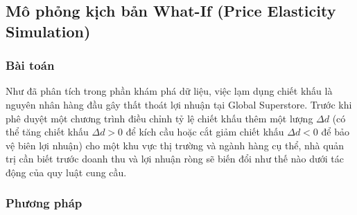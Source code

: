 \subsection{Mô phỏng kịch bản What-If (Price Elasticity Simulation)}

\subsubsection{Bài toán}

Như đã phân tích trong phần khám phá dữ liệu, việc lạm dụng chiết khấu là nguyên nhân hàng đầu gây thất thoát lợi nhuận tại Global Superstore. Trước khi phê duyệt một chương trình điều chỉnh tỷ lệ chiết khấu thêm một lượng $\Delta d$ (có thể tăng chiết khấu $\Delta d > 0$ để kích cầu hoặc cắt giảm chiết khấu $\Delta d < 0$ để bảo vệ biên lợi nhuận) cho một khu vực thị trường và ngành hàng cụ thể, nhà quản trị cần biết trước doanh thu và lợi nhuận ròng sẽ biến đổi như thế nào dưới tác động của quy luật cung cầu.

\subsubsection{Phương pháp}

